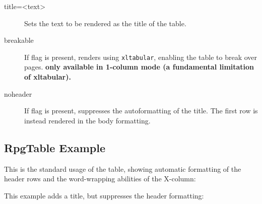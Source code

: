 \begin{macrolist}
{\begin{description}
					\item[title=<text>] Sets the text to be rendered as the title of the table. 
					\item[breakable] If flag is present, renders using \verb|xltabular|, enabling the table to break over pages. \textbf{only available in 1-column mode (a fundamental limitation of xltabular).}
					\item[noheader] If flag is present, suppresses the autoformatting of the title. The first row is instead rendered in the body formatting.
				\end{description}
			}
		\end{macrolist}
		\subsection{RpgTable Example}

		This is the standard usage of the table, showing automatic formatting of the header rows and the word-wrapping abilities of the X-column:


		This example adds a title, but suppresses the header formatting:

		

